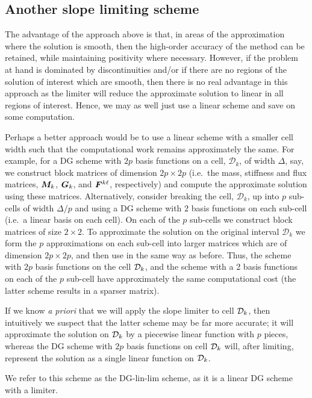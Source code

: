 \subsection{Another slope limiting scheme}\label{sec: anoth pos pres}
The advantage of the approach above is that, in areas of the approximation where the solution is smooth, then the high-order accuracy of the method can be retained, while maintaining positivity where necessary. However, if the problem at hand is dominated by discontinuities and/or if there are no regions of the solution of interest which are smooth, then there is no real advantage in this approach as the limiter will reduce the approximate solution to linear in all regions of interest. Hence, we may as well just use a linear scheme and save on some computation. 

Perhaps a better approach would be to use a linear scheme with a smaller cell width such that the computational work remains approximately the same. For example, for a DG scheme with \(2p\) basis functions on a cell, \(\mathcal D_k\), of width \(\Delta\), say, we construct block matrices of dimension \(2p\times 2p\) (i.e.~the mass, stiffness and flux matrices, \(\boldsymbol M_k\), \(\boldsymbol G_k\), and \(\boldsymbol F^{k\ell}\), respectively) and compute the approximate solution using these matrices. Alternatively, consider breaking the cell, \(\mathcal D_k\), up into \(p\) sub-cells of width \(\Delta/p\) and using a DG scheme with \(2\) basis functions on each sub-cell (i.e.~a linear basis on each cell). On each of the \(p\) sub-cells we construct block matrices of size \(2\times 2\). To approximate the solution on the original interval \(\mathcal D_k\) we form the \(p\) approximations on each sub-cell into larger matrices which are of dimension \(2p\times 2p\), and then use in the same way as before. Thus, the scheme with \(2p\) basis functions on the cell \(\mathcal{D}_k\), and the scheme with a 2 basis functions on each of the \(p\) sub-cell have approximately the same computational cost (the latter scheme results in a sparser matrix). 

If we know \emph{a priori} that we will apply the slope limiter to cell \(\mathcal{D}_k\), then intuitively we suspect that the latter scheme may be far more accurate; it will approximate the solution on \(\mathcal{D}_k\) by a piecewise linear function with \(p\) pieces, whereas the DG scheme with \(2p\) basis functions on cell \(\mathcal{D}_k\) will, after limiting, represent the solution as a single linear function on \(\mathcal{D}_k\). 

We refer to this scheme as the DG-lin-lim scheme, as it is a linear DG scheme with a limiter.

